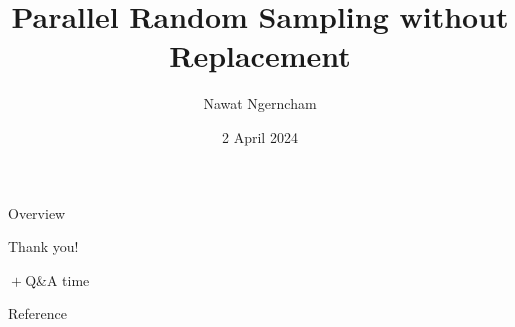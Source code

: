 \documentclass[aspectratio=169]{beamer}
\title{Parallel Random Sampling without Replacement}
\author{Nawat Ngerncham}
\date{2 April 2024}
\begin{document}
\begin{frame}
  \titlepage
\end{frame}

\begin{frame}{Overview}
  \tableofcontents
\end{frame}






\begin{frame}
    \begin{center}
        \Huge{Thank you!}

        \Large{\({}+{}\)Q\&A time}
    \end{center}
\end{frame}

\begin{frame}{Reference}
  
  
\end{frame}
\end{document}
